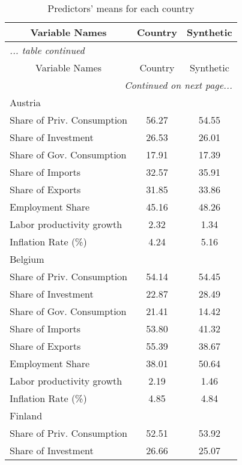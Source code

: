 \begin{center}
\begin{longtable}{lcc}
\caption{\label{clabel} Predictors' means for each country}\\
\hline  
\hline  
 \multicolumn{1}{c}{Variable Names}   & Country  & Synthetic  \\
\hline 
 \endfirsthead
\multicolumn{3}{l}{\emph{... table \thetable{} continued}} \\
\hline \hline 
 \multicolumn{1}{c}{Variable Names}   & Country  & Synthetic  \\
\hline
\endhead
\hline
\multicolumn{3}{r}{\emph{Continued on next page...}}\\
\endfoot
\endlastfoot
Austria &  &  \\  
Share of Priv. Consumption &     56.27 &     54.55 \\  
Share of Investment &     26.53 &     26.01 \\  
Share of Gov. Consumption &     17.91 &     17.39 \\  
Share of Imports &     32.57 &     35.91 \\  
Share of Exports &     31.85 &     33.86 \\  
Employment Share &     45.16 &     48.26 \\  
Labor productivity growth &      2.32 &      1.34 \\  
Inflation Rate (\%) &      4.24 &      5.16 \\  
Belgium &  &  \\  
Share of Priv. Consumption &     54.14 &     54.45 \\  
Share of Investment &     22.87 &     28.49 \\  
Share of Gov. Consumption &     21.41 &     14.42 \\  
Share of Imports &     53.80 &     41.32 \\  
Share of Exports &     55.39 &     38.67 \\  
Employment Share &     38.01 &     50.64 \\  
Labor productivity growth &      2.19 &      1.46 \\  
Inflation Rate (\%) &      4.85 &      4.84 \\  
Finland &  &  \\  
Share of Priv. Consumption &     52.51 &     53.92 \\  
Share of Investment &     26.66 &     25.07 \\  

\end{longtable}
\end{center}
